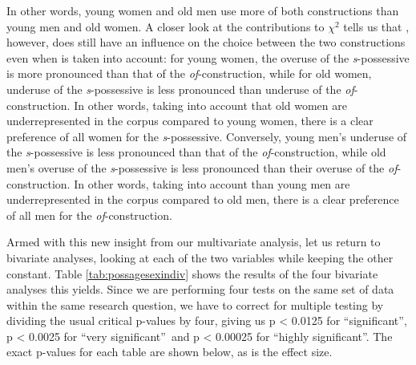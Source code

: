 In other words, young women and old men use more of both constructions than young men and old women. A closer look at the contributions to $\chi^2$ tells us that , however, does still have an influence on the choice between the two constructions even when  is taken into account: for young women, the overuse of the \textit{s}-possessive is more pronounced than that of the \textit{of}-construction, while for old women, underuse of the \textit{s}-possessive is less pronounced than underuse of the \textit{of}-construction. In other words, taking into account that old women are underrepresented in the corpus compared to young women, there is a clear preference of all women for the \textit{s}-possessive. Conversely, young men's underuse of the \textit{s}-possessive is less pronounced than that of the \textit{of}-construction, while old men's overuse of the \textit{s}-possessive is less pronounced than their overuse of the \textit{of}-construction. In other words, taking into account than young men are underrepresented in the corpus compared to old men, there is a clear preference of all men for the \textit{of}-construction.

Armed with this new insight from our multivariate analysis, let us return to bivariate analyses, looking at each of the two variables while keeping the other constant. Table \ref{tab:possagesexindiv} shows the results of the four bivariate analyses this yields. Since we are performing four tests on the same set of data within the same research question, we have to correct for multiple testing by dividing the usual critical p-values by four, giving us p < 0.0125 for ``significant'', p < 0.0025 for ``very significant'' and p < 0.00025 for ``highly significant''. The exact p-values for each table are shown below, as is the effect size.

